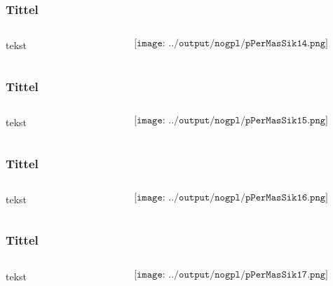 \documentclass[aspectratio=169,xcolor=dvipsnames]{beamer}
\begin{document}
\begin{frame}
	\frametitle{Tittel}
	\begin{columns}
		\begin{column}{0.5\textwidth}
tekst
			
		\end{column}

		\begin{column}{0.5\textwidth}
	$$\texttt{[image: ../output/nogpl/pPerMasSik14.png]}$$
		\end{column}
	\end{columns}
\end{frame}

\begin{frame}
	\frametitle{Tittel}
	\begin{columns}
		\begin{column}{0.5\textwidth}
tekst
			
		\end{column}

		\begin{column}{0.5\textwidth}
	$$\texttt{[image: ../output/nogpl/pPerMasSik15.png]}$$
		\end{column}
	\end{columns}
\end{frame}

\begin{frame}
	\frametitle{Tittel}
	\begin{columns}
		\begin{column}{0.5\textwidth}
tekst
			
		\end{column}

		\begin{column}{0.5\textwidth}
	$$\texttt{[image: ../output/nogpl/pPerMasSik16.png]}$$
		\end{column}
	\end{columns}
\end{frame}

\begin{frame}
	\frametitle{Tittel}
	\begin{columns}
		\begin{column}{0.5\textwidth}
tekst
			
		\end{column}

		\begin{column}{0.5\textwidth}
	$$\texttt{[image: ../output/nogpl/pPerMasSik17.png]}$$
		\end{column}
	\end{columns}
\end{frame}
\end{document}
